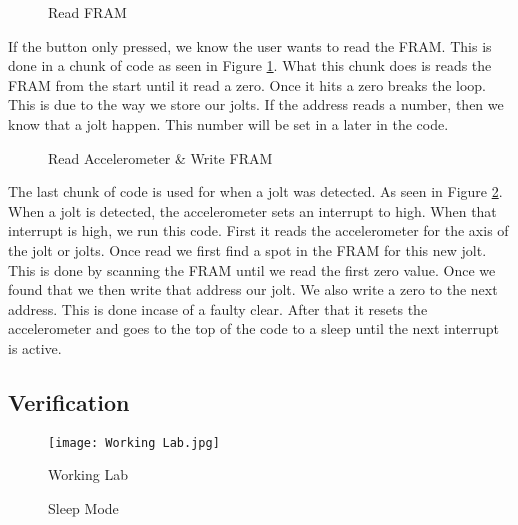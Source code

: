\documentclass{article}
\begin{document}
    \begin{figure}[H]
      
      
      \caption{Read FRAM} 
      \label{fig:Read FRAM} 
    \end{figure}

    If the button only pressed, we know the user wants to read the FRAM. This is done in a chunk of code as seen in Figure \ref{fig:Read FRAM}. What this chunk does is reads the FRAM from the start until it read a zero. Once it hits a zero breaks the loop. This is due to the way we store our jolts. If the address reads a number, then we know that a jolt happen. This number will be set in a later in the code.

    \begin{figure}[H]
      
      \caption{Read Accelerometer \& Write FRAM} 
      \label{fig:Read Accelerometer & Write FRAM} 
    \end{figure}

    The last chunk of code is used for when a jolt was detected. As seen in Figure \ref{fig:Read Accelerometer & Write FRAM}. When a jolt is detected, the accelerometer sets an interrupt to high. When that interrupt is high, we run this code. First it reads the accelerometer for the axis of the jolt or jolts. Once read we first find a spot in the FRAM for this new jolt. This is done by scanning the FRAM until we read the first zero value. Once we found that we then write that address our jolt. We also write a zero to the next address. This is done incase of a faulty clear. After that it resets the accelerometer and goes to the top of the code to a sleep until the next interrupt is active.

  \subsection*{Verification}

    \begin{figure}[H]
      \centering
      \texttt{[image: Working Lab.jpg]}
      \caption{Working Lab}
      \label{fig:Working Lab} 
    \end{figure}

    \begin{figure}[H]
      \centering
      \qquad
      \caption{Sleep Mode}
      \label{fig:Sleep Mode}
    \end{figure}
\end{document}
